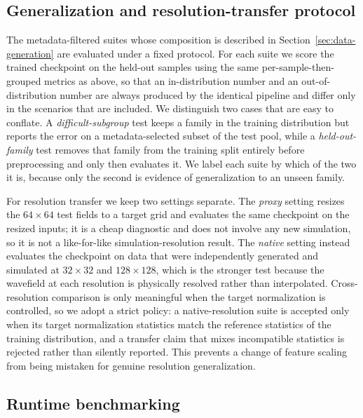 \subsection{Generalization and resolution-transfer protocol}
\label{subsec:generalization-protocol}

The metadata-filtered suites whose composition is described in Section~\ref{sec:data-generation} are evaluated under a fixed protocol. For each suite we score the trained checkpoint on the held-out samples using the same per-sample-then-grouped metrics as above, so that an in-distribution number and an out-of-distribution number are always produced by the identical pipeline and differ only in the scenarios that are included. We distinguish two cases that are easy to conflate. A \emph{difficult-subgroup} test keeps a family in the training distribution but reports the error on a metadata-selected subset of the test pool, while a \emph{held-out-family} test removes that family from the training split entirely before preprocessing and only then evaluates it. We label each suite by which of the two it is, because only the second is evidence of generalization to an unseen family.

For resolution transfer we keep two settings separate. The \emph{proxy} setting resizes the $64 \times 64$ test fields to a target grid and evaluates the same checkpoint on the resized inputs; it is a cheap diagnostic and does not involve any new simulation, so it is not a like-for-like simulation-resolution result. The \emph{native} setting instead evaluates the checkpoint on data that were independently generated and simulated at $32 \times 32$ and $128 \times 128$, which is the stronger test because the wavefield at each resolution is physically resolved rather than interpolated. Cross-resolution comparison is only meaningful when the target normalization is controlled, so we adopt a strict policy: a native-resolution suite is accepted only when its target normalization statistics match the reference statistics of the training distribution, and a transfer claim that mixes incompatible statistics is rejected rather than silently reported. This prevents a change of feature scaling from being mistaken for genuine resolution generalization.

\subsection{Runtime benchmarking}
\label{subsec:runtime}

